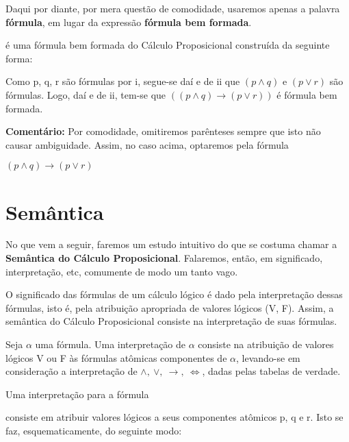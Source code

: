 Daqui por diante, por mera questão de comodidade, usaremos apenas a palavra \textbf{fórmula}, em lugar da expressão \textbf{fórmula bem formada}.


\begin{exemplo}
     é uma fórmula bem formada do Cálculo Proposicional construída da seguinte forma:
\end{exemplo}

Como p, q, r  são fórmulas por i, segue-se daí e de ii que $(p \land q)$ e $(p \lor r)$ são fórmulas.
Logo, daí e de ii, tem-se que $((p \land q) \to (p \lor r))$ é fórmula bem formada.

\bigskip

\noindent \textbf{Comentário:} Por comodidade, omitiremos parênteses sempre que isto não causar ambiguidade. Assim, no caso acima, optaremos pela fórmula


\centerline{$(p \land q) \to (p \lor r)$}

\section{Semântica}
\setcounter{exemplo}{0}
No que vem a seguir, faremos um estudo intuitivo do que se costuma chamar a \textbf{Semântica do Cálculo Proposicional}.
Falaremos, então, em significado, interpretação, etc, comumente de modo um tanto vago.

O significado das fórmulas de um cálculo lógico é dado pela interpretação dessas fórmulas, isto é, pela atribuição apropriada de valores lógicos (V, F).
Assim, a semântica do Cálculo Proposicional consiste na interpretação de suas fórmulas.

Seja $\alpha$ uma fórmula. Uma interpretação de $\alpha$ consiste na atribuição de valores lógicos V  ou F às fórmulas atômicas componentes de $\alpha$, levando-se em consideração a interpretação de $\land,\ \lor,\ \to,\ \iff$, dadas pelas tabelas de verdade.

\begin{exemplo}
    Uma interpretação para a fórmula 
\end{exemplo}
\noindent consiste em atribuir valores lógicos a seus componentes atômicos p, q e r.
Isto se faz, esquematicamente, do seguinte modo:

